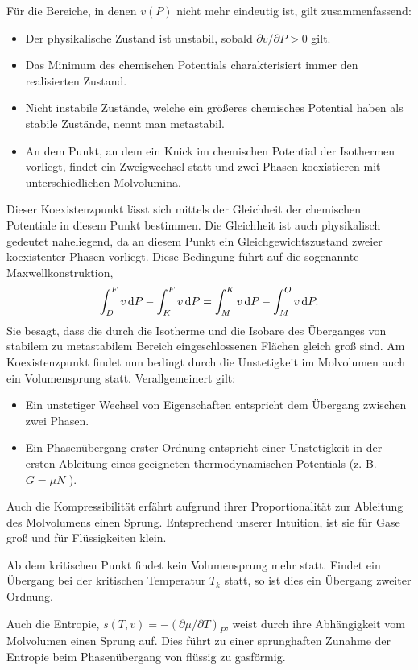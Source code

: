 \begin{summary}
    Für die Bereiche, in denen $v(P)$ nicht mehr eindeutig ist, gilt zusammenfassend:
    \begin{itemize}
        \item Der physikalische Zustand ist unstabil, sobald $\partial v/\partial P>0$ gilt.
        \item Das Minimum des chemischen Potentials charakterisiert immer den realisierten Zustand. 
        \item Nicht instabile Zustände, welche ein größeres chemisches Potential haben als stabile Zustände, nennt man metastabil.
        \item An dem Punkt, an dem ein Knick im chemischen Potential der Isothermen vorliegt, findet ein Zweigwechsel statt und zwei Phasen koexistieren mit unterschiedlichen Molvolumina.
    \end{itemize}
Dieser Koexistenzpunkt lässt sich mittels der Gleichheit der chemischen Potentiale in diesem Punkt bestimmen. Die Gleichheit ist auch physikalisch gedeutet naheliegend, da an diesem Punkt ein Gleichgewichtszustand zweier koexistenter Phasen vorliegt. Diese Bedingung führt auf die sogenannte Maxwellkonstruktion,
\begin{align*}
    \int_D^F v\mathop{}\!\mathrm{d} P-\int_K^F v\mathop{}\!\mathrm{d} P=\int_M^K v\mathop{}\!\mathrm{d} P-\int_M^O v\mathop{}\!\mathrm{d} P.
\end{align*}
Sie besagt, dass die durch die Isotherme und die Isobare des Überganges von stabilem zu metastabilem Bereich eingeschlossenen Flächen gleich groß sind.
Am Koexistenzpunkt findet nun bedingt durch die Unstetigkeit im Molvolumen auch ein Volumensprung statt.  
Verallgemeinert gilt:
\begin{itemize}
    \item Ein unstetiger Wechsel von Eigenschaften entspricht dem Übergang zwischen zwei Phasen.
    \item Ein Phasenübergang erster Ordnung entspricht einer Unstetigkeit in der ersten Ableitung eines
    geeigneten thermodynamischen Potentials (z. B. $G = \mu N$ ).
\end{itemize}
Auch die Kompressibilität erfährt aufgrund ihrer Proportionalität zur Ableitung des Molvolumens einen Sprung. Entsprechend unserer Intuition, ist sie für Gase groß und für Flüssigkeiten klein. 

Ab dem kritischen Punkt findet kein Volumensprung mehr statt. Findet ein Übergang bei der kritischen Temperatur $T_k$ statt, so ist dies ein Übergang zweiter Ordnung. 

Auch die Entropie, $s(T,v)=-\left(\partial \mu/\partial T\right)_P$, weist durch ihre Abhängigkeit vom Molvolumen einen Sprung auf. Dies führt zu einer sprunghaften Zunahme der Entropie beim Phasenübergang von flüssig zu gasförmig.


\end{summary}
